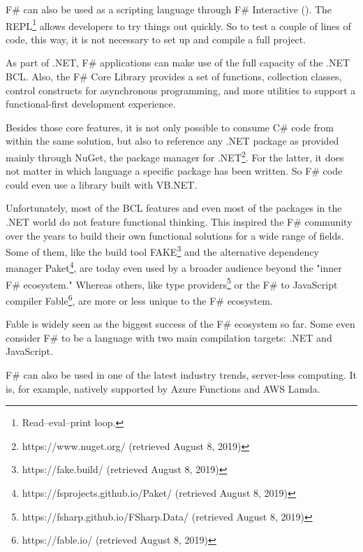 F\# can also be used as a scripting language through F\# Interactive (\cite{bandt_powerful_2017}). The REPL\footnote{Read–eval–print loop.} allows developers to try things out quickly. So to test a couple of lines of code, this way, it is not necessary to set up and compile a full project.

As part of .NET, F\# applications can make use of the full capacity of the .NET BCL. Also, the F\# Core Library provides a set of functions, collection classes, control constructs for asynchronous programming, and more utilities to support a functional-first development experience.

Besides those core features, it is not only possible to consume C\# code from within the same solution, but also to reference any .NET package as provided mainly through NuGet, the package manager for .NET\footnote{https://www.nuget.org/ (retrieved August 8, 2019)}. For the latter, it does not matter in which language a specific package has been written. So F\# code could even use a library built with VB.NET.

Unfortunately, most of the BCL features and even most of the packages in the .NET world do not feature functional thinking. This inspired the F\# community over the years to build their own functional solutions for a wide range of fields. Some of them, like the build tool FAKE\footnote{https://fake.build/ (retrieved August 8, 2019)} and the alternative dependency manager Paket\footnote{https://fsprojects.github.io/Paket/ (retrieved August 8, 2019)}, are today even used by a broader audience beyond the "inner F\# ecosystem." Whereas others, like type providers\footnote{https://fsharp.github.io/FSharp.Data/ (retrieved August 8, 2019)} or the F\# to JavaScript compiler Fable\footnote{https://fable.io/ (retrieved August 8, 2019)}, are more or less unique to the F\# ecosystem.

Fable is widely seen as the biggest success of the F\# ecosystem so far. Some even consider F\# to be a language with two main compilation targets: .NET and JavaScript.

F\# can also be used in one of the latest industry trends, server-less computing. It is, for example, natively supported by Azure Functions and AWS Lamda.

